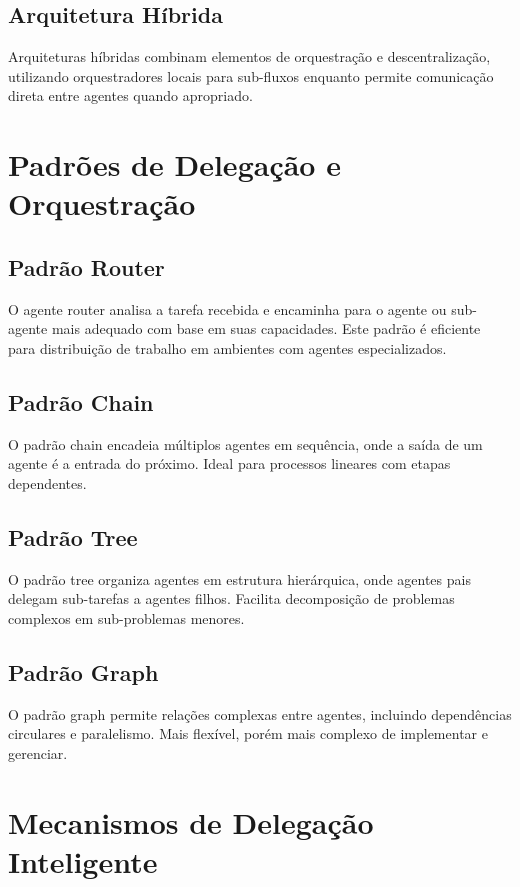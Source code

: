 \documentclass[OA,linenum]{InterPore}
\begin{document}
\subsection{Arquitetura Híbrida}

Arquiteturas híbridas combinam elementos de orquestração e descentralização, utilizando orquestradores locais para sub-fluxos enquanto permite comunicação direta entre agentes quando apropriado.

\section{Padrões de Delegação e Orquestração}

\subsection{Padrão Router}

O agente router analisa a tarefa recebida e encaminha para o agente ou sub-agente mais adequado com base em suas capacidades. Este padrão é eficiente para distribuição de trabalho em ambientes com agentes especializados.

\subsection{Padrão Chain}

O padrão chain encadeia múltiplos agentes em sequência, onde a saída de um agente é a entrada do próximo. Ideal para processos lineares com etapas dependentes.

\subsection{Padrão Tree}

O padrão tree organiza agentes em estrutura hierárquica, onde agentes pais delegam sub-tarefas a agentes filhos. Facilita decomposição de problemas complexos em sub-problemas menores.

\subsection{Padrão Graph}

O padrão graph permite relações complexas entre agentes, incluindo dependências circulares e paralelismo. Mais flexível, porém mais complexo de implementar e gerenciar.

\section{Mecanismos de Delegação Inteligente}
\end{document}
